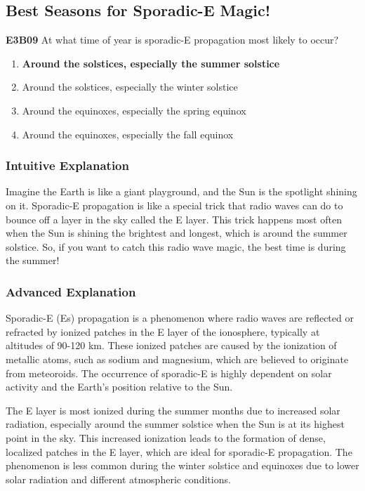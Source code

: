 \subsection{Best Seasons for Sporadic-E Magic!}

\begin{tcolorbox}[colback=gray!10!white,colframe=black!75!black,title=E3B09]
\textbf{E3B09} At what time of year is sporadic-E propagation most likely to occur?
\begin{enumerate}[label=\Alph*.]
    \item \textbf{Around the solstices, especially the summer solstice}
    \item Around the solstices, especially the winter solstice
    \item Around the equinoxes, especially the spring equinox
    \item Around the equinoxes, especially the fall equinox
\end{enumerate}
\end{tcolorbox}

\subsubsection{Intuitive Explanation}
Imagine the Earth is like a giant playground, and the Sun is the spotlight shining on it. Sporadic-E propagation is like a special trick that radio waves can do to bounce off a layer in the sky called the E layer. This trick happens most often when the Sun is shining the brightest and longest, which is around the summer solstice. So, if you want to catch this radio wave magic, the best time is during the summer!

\subsubsection{Advanced Explanation}
Sporadic-E (Es) propagation is a phenomenon where radio waves are reflected or refracted by ionized patches in the E layer of the ionosphere, typically at altitudes of 90-120 km. These ionized patches are caused by the ionization of metallic atoms, such as sodium and magnesium, which are believed to originate from meteoroids. The occurrence of sporadic-E is highly dependent on solar activity and the Earth's position relative to the Sun.

The E layer is most ionized during the summer months due to increased solar radiation, especially around the summer solstice when the Sun is at its highest point in the sky. This increased ionization leads to the formation of dense, localized patches in the E layer, which are ideal for sporadic-E propagation. The phenomenon is less common during the winter solstice and equinoxes due to lower solar radiation and different atmospheric conditions.

